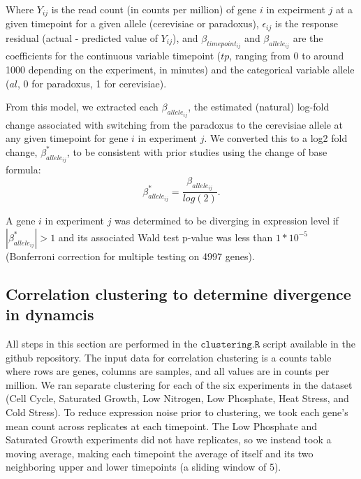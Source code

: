 Where $Y_{ij}$ is the read count (in counts per million) of gene $i$ in expeirment $j$ at a given timepoint for a given allele (cerevisiae or paradoxus), $\epsilon_{ij}$ is the response residual (actual - predicted value of $Y_{ij}$), and $\beta_{timepoint_{ij}}$ and $\beta_{allele_{ij}}$ are the coefficients for the continuous variable timepoint ($tp$, ranging from 0 to around 1000 depending on the experiment, in minutes) and the categorical variable allele ($al$, 0 for paradoxus, 1 for cerevisiae).

From this model, we extracted each $\beta_{allele_{ij}}$, the estimated (natural) log-fold change associated with switching from the paradoxus to the cerevisiae allele at any given timepoint for gene $i$ in experiment $j$. We converted this to a log2 fold change, $\beta^*_{allele_{ij}}$, to be consistent with prior studies using the change of base formula: $$\beta^*_{allele_{ij}} = \frac{\beta_{allele_{ij}}}{log(2)}.$$

A gene $i$ in experiment $j$ was determined to be diverging in expression level if $|\beta^*_{allele_{ij}}| > 1$ and its associated Wald test p-value was less than $1*10^{-5}$ (Bonferroni correction for multiple testing on 4997 genes).


\subsection{Correlation clustering to determine divergence in dynamcis}

All steps in this section are performed in the $\texttt{clustering.R}$ script available in the github repository. The input data for correlation clustering is a counts table where rows are genes, columns are samples, and all values are in counts per million. We ran separate clustering for each of the six experiments in the dataset (Cell Cycle, Saturated Growth, Low Nitrogen, Low Phosphate, Heat Stress, and Cold Stress). To reduce expression noise prior to clustering, we took each gene's mean count across replicates at each timepoint. The Low Phosphate and Saturated Growth experiments did not have replicates, so we instead took a moving average, making each timepoint the average of itself and its two neighboring upper and lower timepoints (a sliding window of 5).

